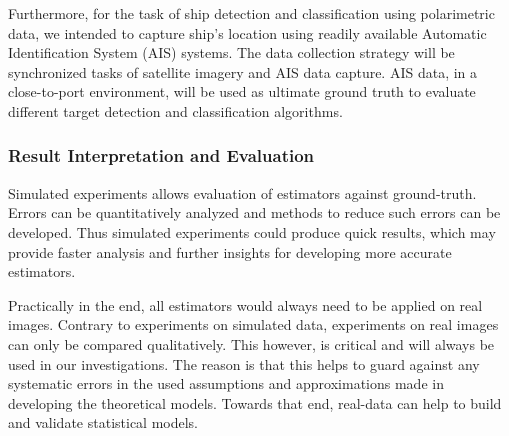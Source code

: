 Furthermore, for the task of ship detection and classification using polarimetric data, we intended to capture ship's location using readily available Automatic Identification System (AIS) systems. 
The data collection strategy will be synchronized tasks of satellite imagery and AIS data capture.
AIS data, in a close-to-port environment, will be used as ultimate ground truth to evaluate different target detection and classification algorithms.

\subsubsection{Result Interpretation and Evaluation}

Simulated experiments allows evaluation of estimators against ground-truth.
Errors can be quantitatively analyzed and methods to reduce such errors can be developed.
Thus simulated experiments could produce quick results, which may provide faster analysis and further insights for developing more accurate estimators.

Practically in the end, all estimators would always need to be applied on real images.
Contrary to experiments on simulated data, experiments on real images can only be compared qualitatively.
This however, is critical and will always be used in our investigations.
The reason is that this helps to guard against any systematic errors in the used assumptions and approximations made in developing the theoretical models.
Towards that end, real-data can help to build and validate statistical models.



